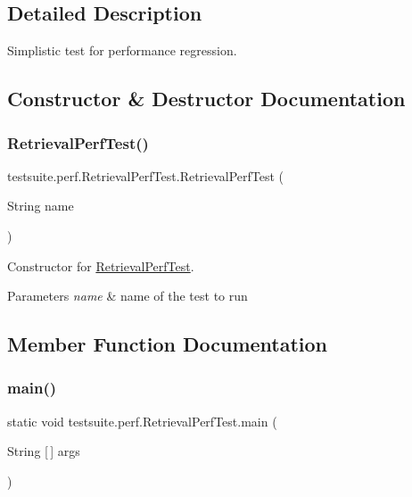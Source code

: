 \subsection{Detailed Description}
Simplistic test for performance regression. 

\subsection{Constructor \& Destructor Documentation}
\mbox{\label{classtestsuite_1_1perf_1_1_retrieval_perf_test_abfe4d6c49777d60f2cb249cb5f72ef0d}} 
\subsubsection{\texorpdfstring{Retrieval\+Perf\+Test()}{RetrievalPerfTest()}}
{\footnotesize\ttfamily testsuite.\+perf.\+Retrieval\+Perf\+Test.\+Retrieval\+Perf\+Test (\begin{DoxyParamCaption}\item[{String}]{name }\end{DoxyParamCaption})}

Constructor for \mbox{\hyperlink{classtestsuite_1_1perf_1_1_retrieval_perf_test}{Retrieval\+Perf\+Test}}.


\begin{DoxyParams}{Parameters}
{\em name} & name of the test to run \\
\hline
\end{DoxyParams}


\subsection{Member Function Documentation}
\mbox{\label{classtestsuite_1_1perf_1_1_retrieval_perf_test_afb26b964fc63ebfdc34ed46e47a88ca5}} 
\subsubsection{\texorpdfstring{main()}{main()}}
{\footnotesize\ttfamily static void testsuite.\+perf.\+Retrieval\+Perf\+Test.\+main (\begin{DoxyParamCaption}\item[{String \mbox{[}$\,$\mbox{]}}]{args }\end{DoxyParamCaption})\hspace{0.3cm}{\ttfamily [static]}}

